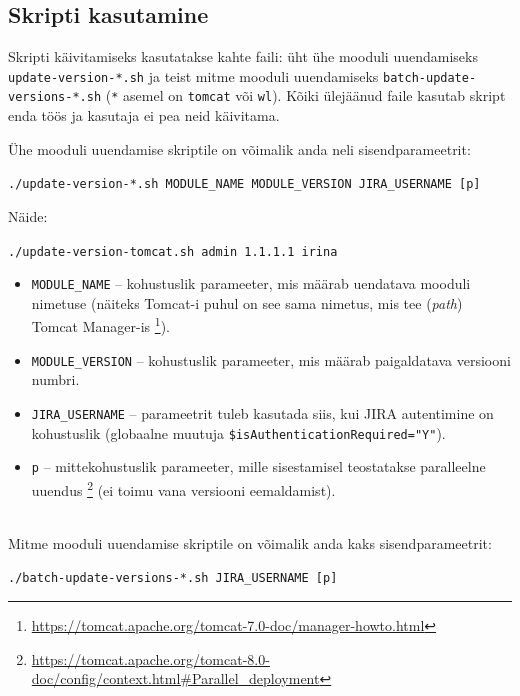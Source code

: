 \documentclass[12pt]{article}
\newcommand{\code}[1]{\texttt{#1}}
\begin{document}
  \newpage
  
  \subsection{Skripti kasutamine} 
   
  Skripti käivitamiseks kasutatakse kahte faili: üht ühe mooduli uuendamiseks \code{update-version-*.sh} ja teist mitme mooduli uuendamiseks \code{batch-update-}\\
  \code{versions-*.sh} (\code{*} asemel on \code{tomcat} või \code{wl}). Kõiki ülejäänud faile kasutab skript enda töös ja kasutaja ei pea neid käivitama.
  
  Ühe mooduli uuendamise skriptile on võimalik anda neli sisendparameetrit:
  \begin{center}
    \small{\code{./update-version-*.sh MODULE\_NAME MODULE\_VERSION JIRA\_USERNAME [p]}}
  \end{center}
  
  Näide:
  \begin{center}
    \small{\code{./update-version-tomcat.sh admin 1.1.1.1 irina}}
  \end{center}

  \begin{itemize}
    \item \code{MODULE\_NAME} \--- kohustuslik parameeter, mis määrab uendatava mooduli nimetuse (näiteks Tomcat-i puhul on see sama nimetus, mis tee (\textit{path}) Tomcat Manager-is \footnote{\url{https://tomcat.apache.org/tomcat-7.0-doc/manager-howto.html}}).
    \item \code{MODULE\_VERSION} \--- kohustuslik parameeter, mis määrab paigaldatava versiooni numbri.
    \item \code{JIRA\_USERNAME} \--- parameetrit tuleb kasutada siis, kui JIRA autentimine on kohustuslik (globaalne muutuja \code{\$isAuthenticationRequired="Y"}).
    \item \code{p} \--- mittekohustuslik parameeter, mille sisestamisel teostatakse paralleelne uuendus \footnote{\url{https://tomcat.apache.org/tomcat-8.0-doc/config/context.html\#Parallel\_deployment}} (ei toimu vana versiooni eemaldamist).
  \end{itemize}\\
  
  Mitme mooduli uuendamise skriptile on võimalik anda kaks sisendparameetrit:
  
  \begin{center}
    \small{\code{./batch-update-versions-*.sh JIRA\_USERNAME [p]}}
  \end{center}
  
\end{document}
